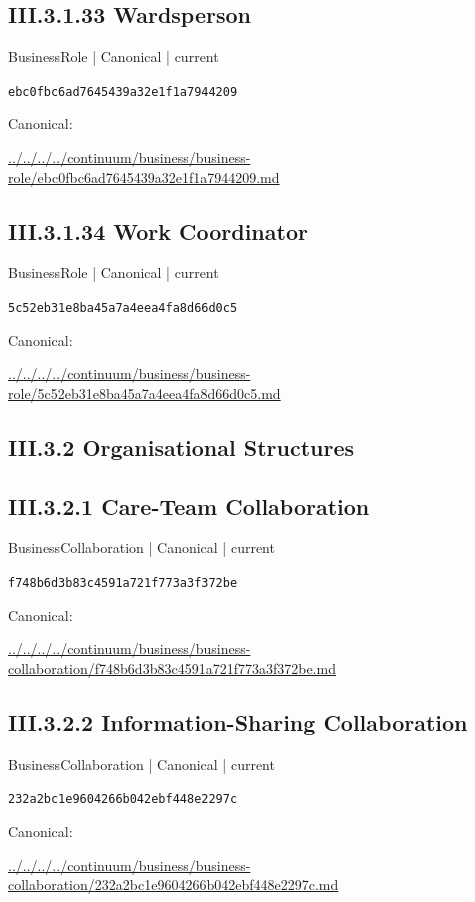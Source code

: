 \documentclass[10pt,a4paper]{article}
\begin{document}
\subsection*{III.3.1.33 Wardsperson}
{\small BusinessRole | Canonical | current}\par
\texttt{ebc0fbc6ad7645439a32e1f1a7944209}\par
Canonical: \par
{\footnotesize\url{../../../../continuum/business/business-role/ebc0fbc6ad7645439a32e1f1a7944209.md}}\par
\subsection*{III.3.1.34 Work Coordinator}
{\small BusinessRole | Canonical | current}\par
\texttt{5c52eb31e8ba45a7a4eea4fa8d66d0c5}\par
Canonical: \par
{\footnotesize\url{../../../../continuum/business/business-role/5c52eb31e8ba45a7a4eea4fa8d66d0c5.md}}\par
\subsection*{III.3.2 Organisational Structures}
\subsection*{III.3.2.1 Care-Team Collaboration}
{\small BusinessCollaboration | Canonical | current}\par
\texttt{f748b6d3b83c4591a721f773a3f372be}\par
Canonical: \par
{\footnotesize\url{../../../../continuum/business/business-collaboration/f748b6d3b83c4591a721f773a3f372be.md}}\par
\subsection*{III.3.2.2 Information-Sharing Collaboration}
{\small BusinessCollaboration | Canonical | current}\par
\texttt{232a2bc1e9604266b042ebf448e2297c}\par
Canonical: \par
{\footnotesize\url{../../../../continuum/business/business-collaboration/232a2bc1e9604266b042ebf448e2297c.md}}\par
\end{document}

